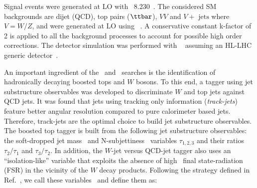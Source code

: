 Signal events were generated at LO with \pythia~8.230~\cite{Sjostrand:2014zea}. The considered SM backgrounds are dijet (QCD), top pairs ($\ttbar$), $VV$ and $V+\text{ jets}$ where $V=W/Z$, and were generated at LO using \MGvATNLO{}~\cite{Alwall:2014hca}. A conservative constant k-factor of 2 is applied to all the background processes to account for possible high order corrections. The detector simulation was performed with \delphes~\cite{deFavereau:2013fsa} assuming an HL-LHC generic detector~\cite{hlhelhc_web}.


\label{sec:mvatagger2}
An important ingredient of the \zptt\ and \rsg\ searches is the identification of hadronically decaying boosted tops and $W$ bosons. To this end, a tagger using jet substructure observables was developed to discriminate $W$ and top jets against QCD jets. It was found that jets using tracking only information (\emph{track-jets}) feature better angular resolution compared to pure calorimeter based jets. Therefore, track-jets are the optimal choice to build jet substructure observables.
The boosted top tagger is built from the following jet substructure observables: the soft-dropped jet mass~\cite{Larkoski:2014wba} and N-subjettiness~\cite{Thaler:2010tr} variables $\tau_{1,2,3}$ and their ratios $\tau_{2}/\tau_{1}$ and $\tau_{3}/\tau_{2}$. In addition, the $W$-jet versus QCD-jet tagger also uses an ``isolation-like'' variable that exploits the absence of high \pt\ final state-radiation (FSR) in the vicinity of the $W$ decay products. Following the strategy defined in Ref.~\cite{Mangano:2016jyj}, we call these variables \eflow\ and define them as:

